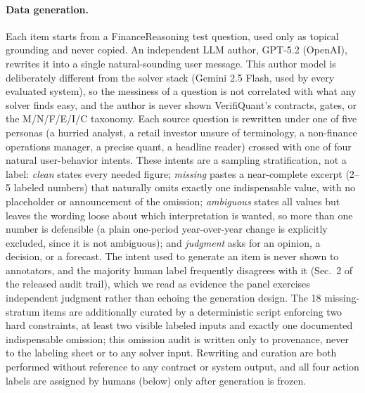 \documentclass[sigconf,anonymous]{acmart}
\begin{document}
\paragraph{Data generation.}
Each item starts from a FinanceReasoning test question, used only as topical grounding and never copied. An independent LLM author, GPT-5.2 (OpenAI), rewrites it into a single natural-sounding user message. This author model is deliberately different from the solver stack (Gemini 2.5 Flash, used by every evaluated system), so the messiness of a question is not correlated with what any solver finds easy, and the author is never shown VerifiQuant's contracts, gates, or the M/N/F/E/I/C taxonomy.
Each source question is rewritten under one of five personas (a hurried analyst, a retail investor unsure of terminology, a non-finance operations manager, a precise quant, a headline reader) crossed with one of four natural user-behavior intents. These intents are a sampling stratification, not a label: \emph{clean} states every needed figure; \emph{missing} pastes a near-complete excerpt (2--5 labeled numbers) that naturally omits exactly one indispensable value, with no placeholder or announcement of the omission; \emph{ambiguous} states all values but leaves the wording loose about which interpretation is wanted, so more than one number is defensible (a plain one-period year-over-year change is explicitly excluded, since it is not ambiguous); and \emph{judgment} asks for an opinion, a decision, or a forecast.
The intent used to generate an item is never shown to annotators, and the majority human label frequently disagrees with it (Sec.~2 of the released audit trail), which we read as evidence the panel exercises independent judgment rather than echoing the generation design.
The 18 missing-stratum items are additionally curated by a deterministic script enforcing two hard constraints, at least two visible labeled inputs and exactly one documented indispensable omission; this omission audit is written only to provenance, never to the labeling sheet or to any solver input.
Rewriting and curation are both performed without reference to any contract or system output, and all four action labels are assigned by humans (below) only after generation is frozen.
\end{document}
